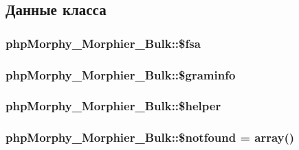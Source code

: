 \subsection{Данные класса}
\hypertarget{classphpMorphy__Morphier__Bulk_a63827a8bfa5f1b3ce8f36c3d79fc27dd}{
\subsubsection[{\$fsa}]{\setlength{\rightskip}{0pt plus 5cm}phpMorphy\_\-Morphier\_\-Bulk::\$fsa}}
\label{classphpMorphy__Morphier__Bulk_a63827a8bfa5f1b3ce8f36c3d79fc27dd}
\hypertarget{classphpMorphy__Morphier__Bulk_ae9b60e58b7b560e30e384ca26a5ad0b1}{
\subsubsection[{\$graminfo}]{\setlength{\rightskip}{0pt plus 5cm}phpMorphy\_\-Morphier\_\-Bulk::\$graminfo}}
\label{classphpMorphy__Morphier__Bulk_ae9b60e58b7b560e30e384ca26a5ad0b1}
\hypertarget{classphpMorphy__Morphier__Bulk_a7d58fc822026887041dd71ff843303a5}{
\subsubsection[{\$helper}]{\setlength{\rightskip}{0pt plus 5cm}phpMorphy\_\-Morphier\_\-Bulk::\$helper}}
\label{classphpMorphy__Morphier__Bulk_a7d58fc822026887041dd71ff843303a5}
\hypertarget{classphpMorphy__Morphier__Bulk_a0f5fce3501ff0a2743d796240813fe27}{
\subsubsection[{\$notfound}]{\setlength{\rightskip}{0pt plus 5cm}phpMorphy\_\-Morphier\_\-Bulk::\$notfound = array()}}
